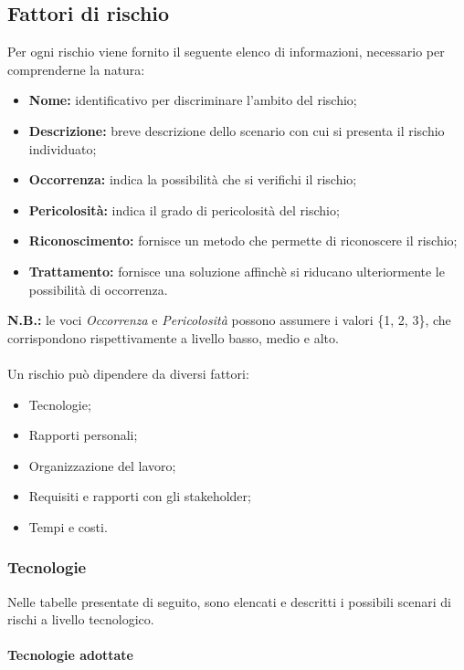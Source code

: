 \subsection{Fattori di rischio}

Per ogni rischio viene fornito il seguente elenco di informazioni, necessario per comprenderne la natura:
\begin{itemize}
	\item \textbf{Nome:} identificativo per discriminare l'ambito del rischio;
	\item \textbf{Descrizione:} breve descrizione dello scenario con cui si presenta il rischio individuato;
	\item \textbf{Occorrenza:} indica la possibilità che si verifichi il rischio;
	\item \textbf{Pericolosità:} indica il grado di pericolosità del rischio;
	\item \textbf{Riconoscimento:} fornisce un metodo che permette di riconoscere il rischio;
	\item \textbf{Trattamento:} fornisce una soluzione affinchè si riducano ulteriormente le possibilità di occorrenza.
\end{itemize}
\textbf{N.B.:} le voci \textit{Occorrenza} e \textit{Pericolosità} possono assumere i valori \{1, 2, 3\}, che corrispondono rispettivamente a livello basso, medio e alto.\\\\
Un rischio può dipendere da diversi fattori:
\begin{itemize}
	\item Tecnologie;
	\item Rapporti personali;
	\item Organizzazione del lavoro;
	\item Requisiti e rapporti con gli stakeholder;
	\item Tempi e costi.
\end{itemize}

\subsubsection{Tecnologie}

Nelle tabelle presentate di seguito, sono elencati e descritti i possibili scenari di rischi a livello tecnologico.

\paragraph{Tecnologie adottate}

